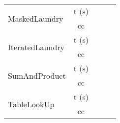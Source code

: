 \begin{center}
\begin{table}[]
\begin{tabular}{|l|c|l|l|l|}
    \multirow{2}{*}{MaskedLaundry}   & t (s)                      &    &         &               \\ \cline{2-5} 
                                     & cc                         &    &         &               \\ \hline
    \multirow{2}{*}{IteratedLaundry} & t (s)                      &    &         &               \\ \cline{2-5} 
                                     & cc                         &    &         &               \\ \hline
    \multirow{2}{*}{SumAndProduct}   & \multicolumn{1}{l|}{t (s)} &    &         &               \\ \cline{2-5} 
                                     & cc                         &    &         &               \\ \hline
    \multirow{2}{*}{TableLookUp}     & \multicolumn{1}{l|}{t (s)} &    &         &               \\ \cline{2-5} 
                                     & cc                         &    &         &               \\ \hline
    \end{tabular}
    \end{table}
\end{center}

